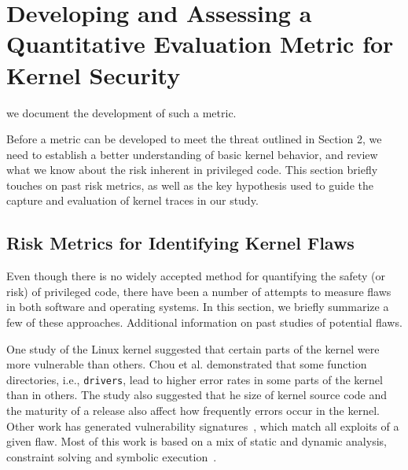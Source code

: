 \section{Developing and Assessing a Quantitative Evaluation Metric for Kernel Security}
\label{sec.metric}

we document the development of such a metric.


Before a metric can be developed to meet the threat outlined in Section 2, we need to
establish a better understanding of basic kernel behavior, and review what we know about
the risk inherent in privileged code. This section briefly touches on past risk
metrics, as well as the key hypothesis used to guide the capture and evaluation
of kernel traces in our study.

\subsection{Risk Metrics for Identifying Kernel Flaws}

Even though there is no widely accepted method for
quantifying the safety (or risk) of privileged code, there have been a number of
attempts to measure flaws in both software and operating systems. In this section,
we briefly summarize a few of these approaches. Additional information on
past studies of potential flaws.


One study of the Linux kernel \cite{PittSFIeld} suggested that certain parts of the kernel
were more vulnerable than others. Chou et al. demonstrated that some function
directories, i.e., \texttt{drivers},
lead to higher error rates in some parts of the kernel than in
others. The study also suggested that he size of kernel source code and the
maturity of a release also affect how frequently errors occur in the kernel.
Other work has generated vulnerability
signatures~\cite{brumley2006towards}, which match all exploits
of a given flaw. Most of this work is based on a mix of static and
dynamic analysis, constraint solving and symbolic execution~\cite{chou2003static}.

